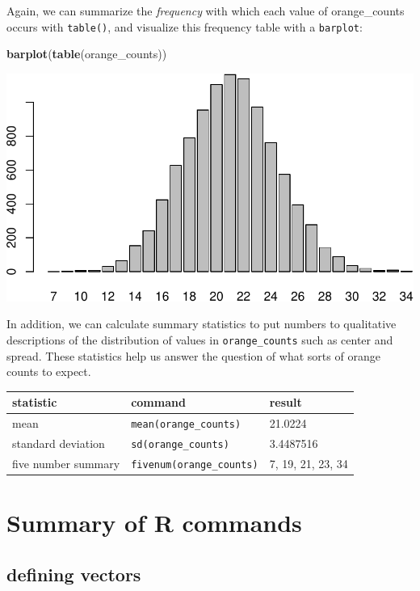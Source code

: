 \documentclass[
]{book}
\newenvironment{Shaded}{\begin{snugshade}}{\end{snugshade}}
\newcommand{\FunctionTok}[1]{\textcolor[rgb]{0.13,0.29,0.53}{\textbf{#1}}}
\newcommand{\NormalTok}[1]{#1}
\theoremstyle{definition}
\theoremstyle{definition}
\theoremstyle{definition}
\theoremstyle{definition}
\theoremstyle{remark}
\begin{document}
Again, we can summarize the \emph{frequency} with which each value of orange\_counts occurs with \texttt{table()}, and visualize this frequency table with a \texttt{barplot}:

\begin{Shaded}
\begin{Highlighting}[]
\FunctionTok{barplot}\NormalTok{(}\FunctionTok{table}\NormalTok{(orange\_counts))}
\end{Highlighting}
\end{Shaded}

\includegraphics{math340-notes_files/figure-latex/unnamed-chunk-98-1.pdf}

In addition, we can calculate summary statistics to put numbers to qualitative descriptions of the distribution of values in \texttt{orange\_counts} such as center and spread. These statistics help us answer the question of what sorts of orange counts to expect.

\begin{longtable}[]{@{}lll@{}}
\toprule\noalign{}
statistic & command & result \\
\midrule\noalign{}
\endhead
\bottomrule\noalign{}
\endlastfoot
mean & \texttt{mean(orange\_counts)} & 21.0224 \\
standard deviation & \texttt{sd(orange\_counts)} & 3.4487516 \\
five number summary & \texttt{fivenum(orange\_counts)} & 7, 19, 21, 23, 34 \\
\end{longtable}

\section{Summary of R commands}\label{sampling-commands}

\subsection*{defining vectors}\label{defining-vectors}
\end{document}
